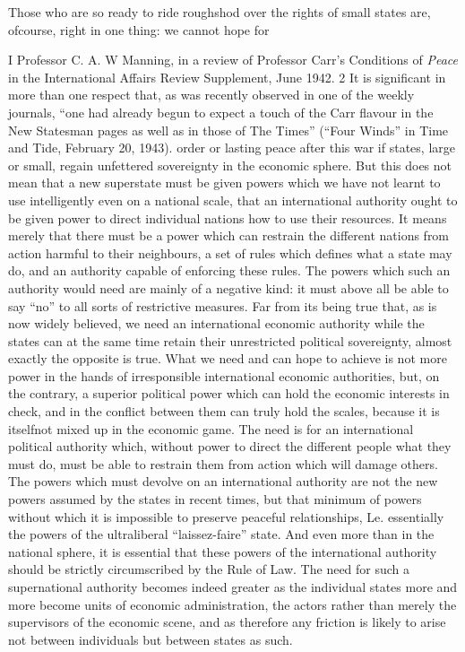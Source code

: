 \documentclass[11pt,openany]{book}
\begin{document}
\begin{center}\textasteriskcentered\hspace{0.9em}\textasteriskcentered\hspace{0.9em}\textasteriskcentered\end{center}

Those who are so ready to ride roughshod over the rights of small states are, ofcourse, right in one thing: we cannot hope for

I Professor C. A. W Manning, in a review of Professor Carr's Conditions of \emph{Peace} in the International Affairs Review Supplement, June 1942. 2 It is significant in more than one respect that, as was recently observed in one of the weekly journals, ``one had already begun to expect a touch of the Carr flavour in the New Statesman pages as well as in those of The Times'' (``Four Winds'' in Time and Tide, February 20, 1943). order or lasting peace after this war if states, large or small, regain unfettered sovereignty in the economic sphere. But this does not mean that a new superstate must be given powers which we have not learnt to use intelligently even on a national scale, that an international authority ought to be given power to direct individual nations how to use their resources. It means merely that there must be a power which can restrain the different nations from action harmful to their neighbours, a set of rules which defines what a state may do, and an authority capable of enforcing these rules. The powers which such an authority would need are mainly of a negative kind: it must above all be able to say ``no'' to all sorts of restrictive measures. Far from its being true that, as is now widely believed, we need an international economic authority while the states can at the same time retain their unrestricted political sovereignty, almost exactly the opposite is true. What we need and can hope to achieve is not more power in the hands of irresponsible international economic authorities, but, on the contrary, a superior political power which can hold the economic interests in check, and in the conflict between them can truly hold the scales, because it is itselfnot mixed up in the economic game. The need is for an international political authority which, without power to direct the different people what they must do, must be able to restrain them from action which will damage others. The powers which must devolve on an international authority are not the new powers assumed by the states in recent times, but that minimum of powers without which it is impossible to preserve peaceful relationships, Le. essentially the powers of the ultraliberal ``laissez-faire'' state. And even more than in the national sphere, it is essential that these powers of the international authority should be strictly circumscribed by the Rule of Law. The need for such a supernational authority becomes indeed greater as the individual states more and more become units of economic administration, the actors rather than merely the supervisors of the economic scene, and as therefore any friction is likely to arise not between individuals but between states as such.
\end{document}
